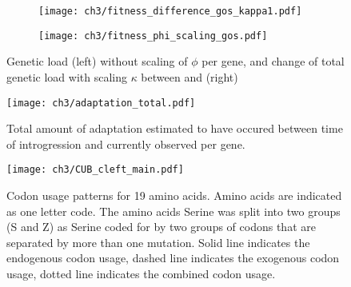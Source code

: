 \begin{figure}[h]
    \centering
    \begin{subfigure}
        \centering
        \texttt{[image: ch3/fitness\_difference\_gos\_kappa1.pdf]}
    \end{subfigure}
    \begin{subfigure}
        \centering
        \texttt{[image: ch3/fitness\_phi\_scaling\_gos.pdf]}
    \end{subfigure}
    \caption{Genetic load (left) without scaling of $\phi$ per gene, and change of total genetic load with scaling $\kappa$ between \gossypii and \kluyveri (right)}
    \label{fig:sne_scaling}
\end{figure}
\null
\vfill
\clearpage
\null
\vfill
\begin{figure}[H]
     \centering
	\texttt{[image: ch3/adaptation\_total.pdf]}
	\caption{Total amount of adaptation estimated to have occured between time of introgression and currently observed per gene.}
	\label{fig:adapt_tot}
\end{figure}
\null
\vfill
\clearpage

\begin{figure}[H]
     \centering
	\texttt{[image: ch3/CUB\_cleft\_main.pdf]}
	\caption{Codon usage patterns for 19 amino acids. Amino acids are indicated as one letter code. 
	The amino acids Serine was split into two groups (S and Z) as Serine coded for by two groups of codons that are separated by more than one mutation.
	Solid line indicates the endogenous codon usage, dashed line indicates the exogenous codon usage, dotted line indicates the combined codon usage.}
	\label{fig:cub_all_sets}
\end{figure}
\doublespacing